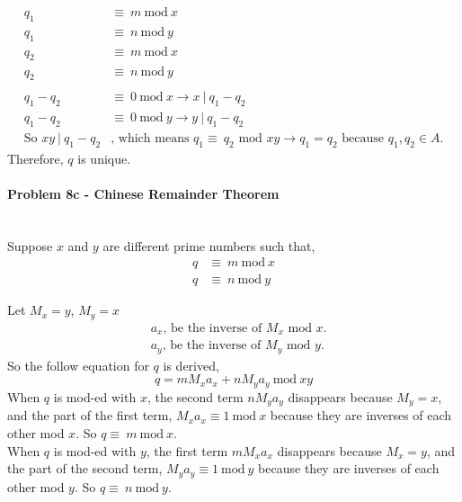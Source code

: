 \documentclass[fleqn]{article}
\begin{document}
\begin{align*}
q_1 &\equiv\ m\ \textrm{mod}\ x\\
q_1 &\equiv\ n\ \textrm{mod}\ y\\
q_2 &\equiv\ m\ \textrm{mod}\ x\\
q_2 &\equiv\ n\ \textrm{mod}\ y\\
\\
q_1 - q_2 &\equiv\ 0\ \textrm{mod}\ x \rightarrow x\ |\ q_1-q_2\\
q_1 - q_2 &\equiv\ 0\ \textrm{mod}\ y \rightarrow y\ |\ q_1-q_2\\
\text{So $xy\ |\ q_1-q_2$}&\text{, which means $q_1 \equiv\ q_2$ mod $xy \rightarrow q_1=q_2$ because $q_1, q_2 \in A$.}
\end{align*}
\noindent
Therefore, $q$ is unique.

\paragraph{Problem 8c - Chinese Remainder Theorem} ~\\
Suppose $x$ and $y$ are different prime numbers such that,
\begin{align*}
q &\equiv\ m\ \textrm{mod}\ x\\
q &\equiv\ n\ \textrm{mod}\ y
\end{align*}

\noindent
Let $M_x=y$, $M_y=x$
\begin{align*}
&a_x \text{, be the inverse of $M_x$ mod $x$.}\\
&a_y \text{, be the inverse of $M_y$ mod $y$.}
\end{align*}
\noindent
So the follow equation for $q$ is derived,
\begin{equation*}
q = mM_xa_x + nM_ya_y\ \textrm{mod}\ xy
\end{equation*}
When $q$ is mod-ed with $x$, the second term $nM_ya_y$ disappears because $M_y=x$, and the part of the first term, $M_xa_x \equiv 1\ \textrm{mod}\ x$ because they are inverses of each other mod $x$. So $q \equiv\ m\ \textrm{mod}\ x$.\\

\noindent
When $q$ is mod-ed with $y$, the first term $mM_xa_x$ disappears because $M_x=y$, and the part of the second term, $M_ya_y \equiv 1\ \textrm{mod}\ y$ because they are inverses of each other mod $y$.  So $q \equiv\ n\ \textrm{mod}\ y$.\\
\end{document}
